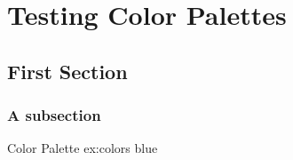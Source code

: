 \chapter{Testing Color Palettes}
\minitoc

\section{First Section}

\lipsum[1]
\subsection{A subsection}
\lipsum[1]
\begin{texexample}{Color Palette} {ex:colors}
\def\atest{blue}
\atest
\end{texexample}